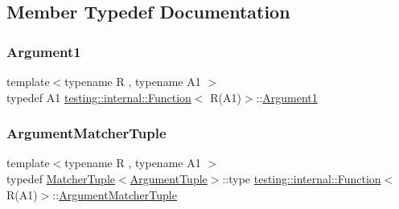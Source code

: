 \subsection{Member Typedef Documentation}
\mbox{\label{structtesting_1_1internal_1_1_function_3_01_r_07_a1_08_4_aca36c8586218fd015cc4736dc8d4c14f}} 
\subsubsection{\texorpdfstring{Argument1}{Argument1}}
{\footnotesize\ttfamily template$<$typename R , typename A1 $>$ \\
typedef A1 \hyperlink{structtesting_1_1internal_1_1_function}{testing\+::internal\+::\+Function}$<$ R(A1)$>$\+::\hyperlink{structtesting_1_1internal_1_1_function_3_01_r_07_a1_08_4_aca36c8586218fd015cc4736dc8d4c14f}{Argument1}}

\mbox{\label{structtesting_1_1internal_1_1_function_3_01_r_07_a1_08_4_a0e35671ae43c3d3310893e1d6d895d06}} 
\subsubsection{\texorpdfstring{Argument\+Matcher\+Tuple}{ArgumentMatcherTuple}}
{\footnotesize\ttfamily template$<$typename R , typename A1 $>$ \\
typedef \hyperlink{structtesting_1_1internal_1_1_matcher_tuple}{Matcher\+Tuple}$<$\hyperlink{structtesting_1_1internal_1_1_function_3_01_r_07_08_4_ad483c3128c470d8cdb55c3ac1c575c11}{Argument\+Tuple}$>$\+::type \hyperlink{structtesting_1_1internal_1_1_function}{testing\+::internal\+::\+Function}$<$ R(A1)$>$\+::\hyperlink{structtesting_1_1internal_1_1_function_3_01_r_07_08_4_a9bec5cf8937e8af99dedab2f40129fab}{Argument\+Matcher\+Tuple}}

